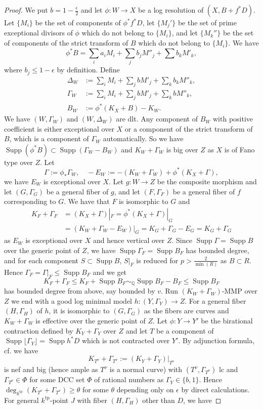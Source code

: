 \documentclass[letterpaper,reqno,12pt]{amsart}
\DeclareMathOperator{\Supp}{Supp}
\newcommand{\tp}{\mathrm{tp}}
\numberwithin{equation}{section}
\theoremstyle{plain}
\begin{document}
\begin{proof}
    We put $b=1-\frac{\epsilon}{2}$ and let $\phi:W\to X$ be a log resolution of $(X, B+f^*D)$. Let $\{M_i\}$ be the set of components of $\phi^*f^*D$, let $\{M_j'\}$ be the set of prime exceptional divisors of $\phi$ which do not belong to $\{M_i\}$, and let $\{M_k''\}$ be the set of components of the strict transform of $B$ which do not belong to $\{M_i\}$. We have 
    \[\phi^*B=\sum\limits_i a_i M_i+\sum\limits_j b_j M''_j+\sum\limits b_k M'_k,\]
    where $b_j\leq 1-\epsilon$ by definition. Define
    \[\begin{aligned}
        \Delta_W&:=\sum\limits_i M_i+\sum\limits_jbM'_j+\sum\limits_k b_kM''_k,\\
        \Gamma_W&:=\sum\limits_i M_i+\sum\limits_jbM'_j+\sum\limits_k bM''_k,\\
        B_W&:=\phi^*(K_X+B)-K_W.
    \end{aligned}\]
    We have $(W,\Gamma_W)$ and $(W,\Delta_W)$ are dlt. Any component of $B_W$ with positive coefficient is either exceptional over $X$ or a component of the strict transform of $B$, which is a component of $\Gamma_W$ automatically. So we have $\Supp(\phi^*B)\subset\Supp(\Gamma_W-B_W)$ and $K_W+\Gamma_W$ is big over $Z$ as $X$ is of Fano type over $Z$. Let \[\Gamma:=\phi_*\Gamma_W,\quad-E_W:=-(K_W+\Gamma_W)+\phi^*(K_X+\Gamma),\] we have $E_W$ is exceptional over $X$. Let $g:W\to Z$ be the composite morphism and let $(G,\Gamma_G)$ be a general fiber of $g$, and let $(F,\Gamma_F)$ be a general fiber of $f$ corresponding to $G$. We have that $F$ is isomorphic to $G$ and \[\begin{aligned}K_F+\Gamma_F&=(K_X+\Gamma)|_F=\phi^*(K_X+\Gamma)|_G\\&=(K_W+\Gamma_W-E_W)|_G=K_G+\Gamma_G-E_G=K_G+\Gamma_G\end{aligned}\] as $E_W$ is exceptional over $X$ and hence vertical over $Z$. Since $\Supp \Gamma=\Supp B$ over the generic point of $Z$, we have $\Supp\Gamma_F=\Supp B_F$ has bounded degree, and for each component $S\subset \Supp B$, $S|_F$ is reduced for $p>\frac{2}{\min (R)}$ as $B\subset R$. Hence $\Gamma_F=\Gamma|_F\leq \Supp B_F$ and we get
    \[K_F+\Gamma_F\leq K_F+\Supp B_F\sim_\mathbb Q \Supp B_F-B_F\leq \Supp B_F\]
    has bounded degree from above, say bounded by $v$. Run $(K_W+\Gamma_W)$-MMP over $Z$ we end with a good log minimal model $h:(Y,\Gamma_Y)\to Z$. For a general fiber $(H,\Gamma_H)$ of $h$, it is isomorphic to $(G,\Gamma_G)$ as the fibers are curves and $K_W+\Gamma_W$ is effective over the generic point of $Z$. Let $\phi:Y\to Y'$ be the birational contraction defined by $K_Y+\Gamma_Y$ over $Z$ and let $T$ be a component of $\Supp\lfloor \Gamma_Y\rfloor=\Supp h^*D$ which is not contracted over $Y'$. By adjunction formula, cf. \cite[Proposition 2.8]{DasWeakBAB} we have \[K_{T^\nu}+\Gamma_{T^\nu}:=(K_Y+\Gamma_Y)|_{T^\nu}\] is nef and big (hence ample as $T^\nu$ is a normal curve) with $(T^\nu,\Gamma_{T^\nu})$ lc and $\Gamma_{T^\nu}\in \Phi $ for some DCC set $\Phi$ of rational numbers as $\Gamma_Y\in\{b,1\}$. Hence $\deg_{k^\tp}(K_{T^\nu}+\Gamma_{T^\nu})\geq \theta$ for some $\theta$ depending only on $\epsilon$ by direct calculations. For general $k^\tp$-point $J$ with fiber $(H,\Gamma_H)$ other than $D$, we have

\end{proof}
\end{document}
